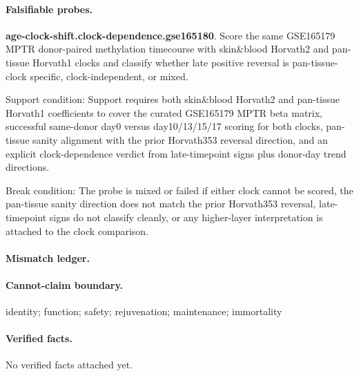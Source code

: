 \paragraph{Falsifiable probes.}
\textbf{age-clock-shift.clock-dependence.gse165180}. Score the same GSE165179 MPTR donor-paired methylation timecourse with skin\&blood Horvath2 and pan-tissue Horvath1 clocks and classify whether late positive reversal is pan-tissue-clock specific, clock-independent, or mixed.

Support condition: Support requires both skin\&blood Horvath2 and pan-tissue Horvath1 coefficients to cover the curated GSE165179 MPTR beta matrix, successful same-donor day0 versus day10/13/15/17 scoring for both clocks, pan-tissue sanity alignment with the prior Horvath353 reversal direction, and an explicit clock-dependence verdict from late-timepoint signs plus donor-day trend directions.

Break condition: The probe is mixed or failed if either clock cannot be scored, the pan-tissue sanity direction does not match the prior Horvath353 reversal, late-timepoint signs do not classify cleanly, or any higher-layer interpretation is attached to the clock comparison.

\paragraph{Mismatch ledger.}
\paragraph{Cannot-claim boundary.} identity; function; safety; rejuvenation; maintenance; immortality

\paragraph{Verified facts.}
No verified facts attached yet.
